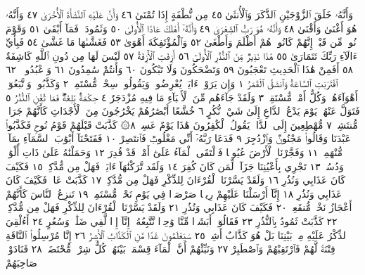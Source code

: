 وَأَنَّهُۥ خَلَقَ ٱلزَّوْجَيْنِ ٱلذَّكَرَ وَٱلْأُنثَىٰ ٤٥ مِن نُّطْفَةٍ إِذَا تُمْنَىٰ ٤٦
وَأَنَّ عَلَيْهِ ٱلنَّشْأَةَ ٱلْأُخْرَىٰ ٤٧ وَأَنَّهُۥ هُوَ أَغْنَىٰ وَأَقْنَىٰ ٤٨ وَأَنَّهُۥ هُوَ
رَبُّ ٱلشِّعْرَىٰ ٤٩ وَأَنَّهُۥٓ أَهْلَكَ عَادًا ٱلْأُولَىٰ ٥٠ وَثَمُودَا۟ فَمَآ
أَبْقَىٰ ٥١ وَقَوْمَ نُوحࣲ مِّن قَبْلُۖ إِنَّهُمْ كَانُوا۟ هُمْ أَظْلَمَ وَأَطْغَىٰ ٥٢
وَٱلْمُؤْتَفِكَةَ أَهْوَىٰ ٥٣ فَغَشَّىٰهَا مَا غَشَّىٰ ٥٤ فَبِأَيِّ ءَالَآءِ رَبِّكَ
تَتَمَارَىٰ ٥٥ هَٰذَا نَذِيرࣱ مِّنَ ٱلنُّذُرِ ٱلْأُولَىٰٓ ٥٦ أَزِفَتِ ٱلْأٓزِفَةُ ٥٧
لَيْسَ لَهَا مِن دُونِ ٱللَّهِ كَاشِفَةٌ ٥٨ أَفَمِنْ هَٰذَا ٱلْحَدِيثِ
تَعْجَبُونَ ٥٩ وَتَضْحَكُونَ وَلَا تَبْكُونَ ٦٠ وَأَنتُمْ سَٰمِدُونَ ٦١
 وَٱعْبُدُوا۟۩ ٦٢
ٱقْتَرَبَتِ ٱلسَّاعَةُ وَٱنشَقَّ ٱلْقَمَرُ ١ وَإِن يَرَوْا۟ ءَايَةࣰ يُعْرِضُوا۟ وَيَقُولُوا۟
سِحْرࣱ مُّسْتَمِرࣱّ ٢ وَكَذَّبُوا۟ وَٱتَّبَعُوٓا۟ أَهْوَآءَهُمْۚ وَكُلُّ أَمْرࣲ مُّسْتَقِرࣱّ ٣
وَلَقَدْ جَآءَهُم مِّنَ ٱلْأَنۢبَآءِ مَا فِيهِ مُزْدَجَرٌ ٤ حِكْمَةُۢ بَٰلِغَةࣱۖ فَمَا تُغْنِ
ٱلنُّذُرُ ٥ فَتَوَلَّ عَنْهُمْۘ يَوْمَ يَدْعُ ٱلدَّاعِ إِلَىٰ شَيْءࣲ نُّكُرٍ ٦
خُشَّعًا أَبْصَٰرُهُمْ يَخْرُجُونَ مِنَ ٱلْأَجْدَاثِ كَأَنَّهُمْ جَرَادࣱ مُّنتَشِرࣱ ٧
مُّهْطِعِينَ إِلَى ٱلدَّاعِۖ يَقُولُ ٱلْكَٰفِرُونَ هَٰذَا يَوْمٌ عَسِرࣱ ٨۞ كَذَّبَتْ
قَبْلَهُمْ قَوْمُ نُوحࣲ فَكَذَّبُوا۟ عَبْدَنَا وَقَالُوا۟ مَجْنُونࣱ وَٱزْدُجِرَ ٩ فَدَعَا
رَبَّهُۥٓ أَنِّي مَغْلُوبࣱ فَٱنتَصِرْ ١٠ فَفَتَحْنَآ أَبْوَٰبَ ٱلسَّمَآءِ بِمَآءࣲ مُّنْهَمِرࣲ ١١
وَفَجَّرْنَا ٱلْأَرْضَ عُيُونࣰا فَٱلْتَقَى ٱلْمَآءُ عَلَىٰٓ أَمْرࣲ قَدْ قُدِرَ ١٢
وَحَمَلْنَٰهُ عَلَىٰ ذَاتِ أَلْوَٰحࣲ وَدُسُرࣲ ١٣ تَجْرِي بِأَعْيُنِنَا جَزَآءࣰ لِّمَن كَانَ
كُفِرَ ١٤ وَلَقَد تَّرَكْنَٰهَآ ءَايَةࣰ فَهَلْ مِن مُّدَّكِرࣲ ١٥ فَكَيْفَ كَانَ
عَذَابِي وَنُذُرِ ١٦ وَلَقَدْ يَسَّرْنَا ٱلْقُرْءَانَ لِلذِّكْرِ فَهَلْ مِن مُّدَّكِرࣲ ١٧
كَذَّبَتْ عَادࣱ فَكَيْفَ كَانَ عَذَابِي وَنُذُرِ ١٨ إِنَّآ أَرْسَلْنَا عَلَيْهِمْ رِيحࣰا
صَرْصَرࣰا فِي يَوْمِ نَحْسࣲ مُّسْتَمِرࣲّ ١٩ تَنزِعُ ٱلنَّاسَ كَأَنَّهُمْ أَعْجَازُ نَخْلࣲ
مُّنقَعِرࣲ ٢٠ فَكَيْفَ كَانَ عَذَابِي وَنُذُرِ ٢١ وَلَقَدْ يَسَّرْنَا ٱلْقُرْءَانَ
لِلذِّكْرِ فَهَلْ مِن مُّدَّكِرࣲ ٢٢ كَذَّبَتْ ثَمُودُ بِٱلنُّذُرِ ٢٣ فَقَالُوٓا۟ أَبَشَرࣰا
مِّنَّا وَٰحِدࣰا نَّتَّبِعُهُۥٓ إِنَّآ إِذࣰا لَّفِي ضَلَٰلࣲ وَسُعُرٍ ٢٤ أَءُلْقِيَ ٱلذِّكْرُ عَلَيْهِ مِنۢ
بَيْنِنَا بَلْ هُوَ كَذَّابٌ أَشِرࣱ ٢٥ سَيَعْلَمُونَ غَدࣰا مَّنِ ٱلْكَذَّابُ ٱلْأَشِرُ ٢٦
إِنَّا مُرْسِلُوا۟ ٱلنَّاقَةِ فِتْنَةࣰ لَّهُمْ فَٱرْتَقِبْهُمْ وَٱصْطَبِرْ ٢٧
وَنَبِّئْهُمْ أَنَّ ٱلْمَآءَ قِسْمَةُۢ بَيْنَهُمْۖ كُلُّ شِرْبࣲ مُّحْتَضَرࣱ ٢٨ فَنَادَوْا۟ صَاحِبَهُمْ
